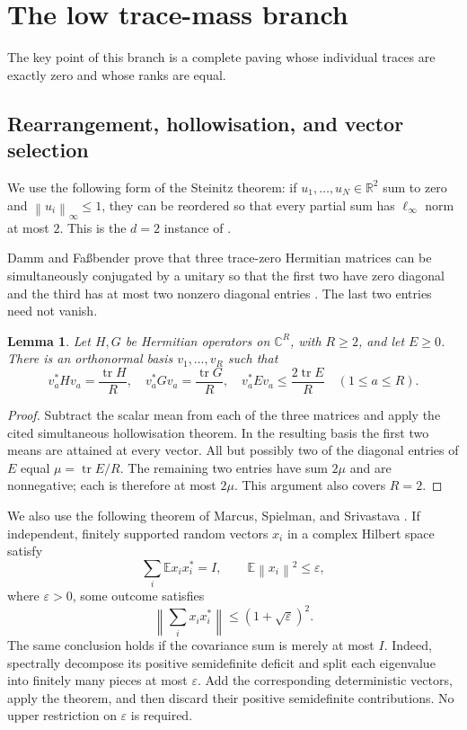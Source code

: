 \documentclass[11pt]{article}
\newtheorem{lemma}[theorem]{Lemma}
\theoremstyle{remark}
\newcommand{\C}{\mathbb C}
\newcommand{\R}{\mathbb R}
\newcommand{\tr}{\operatorname{tr}}
\newcommand{\norm}[1]{\left\lVert#1\right\rVert}
\numberwithin{equation}{section}
\begin{document}
\section{The low trace-mass branch}\label{sec:low}
The key point of this branch is a complete paving whose individual traces are
exactly zero and whose ranks are equal.

\subsection{Rearrangement, hollowisation, and vector selection}
We use the following form of the Steinitz theorem: if $u_1,\ldots,u_N\in\R^2$
sum to zero and $\norm{u_i}_\infty\le1$, they can be reordered so that every
partial sum has $\ell_\infty$ norm at most $2$. This is the $d=2$ instance of
\cite[Theorem 1.2]{Barany}.

Damm and Fa\ss bender prove that three trace-zero Hermitian matrices can be
simultaneously conjugated by a unitary so that the first two have zero diagonal
and the third has at most two nonzero diagonal entries
\cite[Proposition 13(b)]{DF}. The last two entries need not vanish.

\begin{lemma}\label{lem:flatbasis}
Let $H,G$ be Hermitian operators on $\C^R$, with $R\ge2$, and let $E\ge0$.
There is an orthonormal basis $v_1,\ldots,v_R$ such that
\begin{equation}\label{eq:flatbasis}
 v_a^*Hv_a=\frac{\tr H}{R},\quad
 v_a^*Gv_a=\frac{\tr G}{R},\quad
 v_a^*Ev_a\le\frac{2\tr E}{R}\quad(1\le a\le R).
\end{equation}
\end{lemma}
\begin{proof}
Subtract the scalar mean from each of the three matrices and apply the cited
simultaneous hollowisation theorem. In the resulting basis the first two means
are attained at every vector. All but possibly two of the diagonal entries of
$E$ equal $\mu=\tr E/R$. The remaining two entries have sum $2\mu$ and are
nonnegative; each is therefore at most $2\mu$. This argument also covers
$R=2$.
\end{proof}

We also use the following theorem of Marcus, Spielman, and Srivastava
\cite[Theorem 1.4]{MSS}. If independent, finitely supported random vectors $x_i$
in a complex Hilbert space satisfy
\begin{equation}\label{eq:MSSassumptions}
 \sum_i\mathbb E x_ix_i^*=I,\qquad
 \mathbb E\norm{x_i}^2\le\varepsilon,
\end{equation}
where $\varepsilon>0$, some outcome satisfies
\begin{equation}\label{eq:MSSconclusion}
 \norm{\sum_i x_ix_i^*}\le(1+\sqrt\varepsilon)^2.
\end{equation}
The same conclusion holds if the covariance sum is merely at most $I$.
Indeed, spectrally decompose its positive semidefinite deficit and split each
eigenvalue into finitely many pieces at most $\varepsilon$. Add the corresponding
deterministic vectors, apply the theorem, and then discard their positive
semidefinite contributions. No upper restriction on $\varepsilon$ is required.
\end{document}
